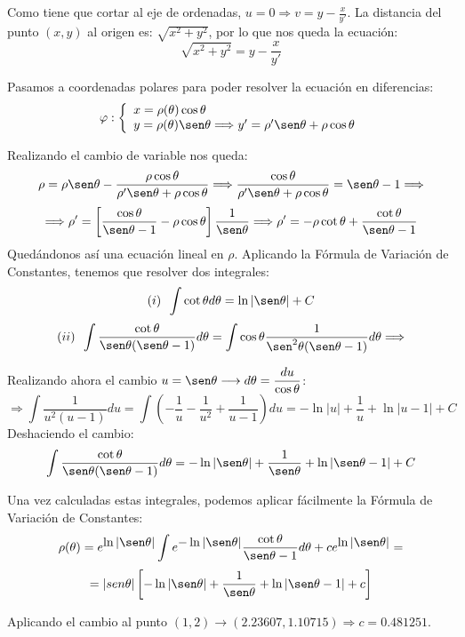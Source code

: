 \documentclass[12pt]{article}
\begin{document}
\begin{enumerate}
Como tiene que cortar al eje de ordenadas, $u=0 \Longrightarrow v = y \displaystyle-\frac{x}{y'}$. La distancia del punto $(x,y)$ al origen es: $\sqrt{x^2+y^2}$, por lo que nos queda la ecuación:
\[
\sqrt{x^2+y^2}=y-\frac{x}{y'}
\]

Pasamos a coordenadas polares para poder resolver la ecuación en diferencias:
\[
\varphi : \left \{ \begin{array}{l}
x=\rho(\theta)\cos\theta \\
y=\rho(\theta)\sen\theta \Longrightarrow y'=\rho'\sen\theta+\rho\cos\theta
\end{array}
\right.
\]

Realizando el cambio de variable nos queda:
\[
\rho=\rho\sen\theta-\frac{\rho\cos\theta}{\rho'\sen\theta+\rho\cos\theta} \Longrightarrow \frac{\cos\theta}{\rho'\sen\theta+\rho\cos\theta}=\sen\theta-1\Longrightarrow
\]
\[
\Longrightarrow\rho'=\left[\frac{\cos\theta}{\sen\theta-1}-\rho\cos\theta\right]\frac{1}{\sen\theta}\Longrightarrow\rho'=-\rho\cot\theta+\frac{\cot\theta}{\sen\theta-1}
\]
Quedándonos así una ecuación lineal en $\rho$. Aplicando la Fórmula de Variación de Constantes, tenemos que resolver dos integrales:
\[
(i)\enskip\int \cot\theta d\theta=\ln|\sen\theta|+C
\]
\[
(ii) \enskip\int \frac{\cot\theta}{\sen\theta(\sen\theta-1)}d\theta=\int \cos\theta\frac{1}{\sen^2\theta(\sen\theta-1)}d\theta \Longrightarrow
\]

Realizando ahora el cambio $u=\sen\theta\longrightarrow d\theta=\displaystyle\frac{du}{\cos\theta}$:
\[
\Longrightarrow \int \frac{1}{u^2(u-1)}du=\int\left(-\frac{1}{u}-\frac{1}{u^2}+\frac{1}{u-1}\right)du=-\ln|u|+\frac{1}{u}+\ln|u-1|+C
\]
Deshaciendo el cambio:
\[
\int\frac{\cot\theta}{\sen\theta(\sen\theta-1)}d\theta=-\ln|\sen\theta|+\frac{1}{\sen\theta}+\ln|\sen\theta-1|+C
\]

Una vez calculadas estas integrales, podemos aplicar fácilmente la Fórmula de Variación de Constantes:
\[
\rho(\theta)=e^{\displaystyle\ln|\sen\theta|}\int e^{\displaystyle-\ln|\sen\theta|}\frac{\cot\theta}{\sen\theta-1}d\theta+ce^{\displaystyle\ln|\sen\theta|}=
\]
\[
=|sen\theta|\left[-\ln|\sen\theta|+\frac{1}{\sen\theta}+\ln|\sen\theta-1|+c\right]
\]

Aplicando el cambio al punto $(1,2) \longrightarrow (2.23607,1.10715) \Longrightarrow c=0.481251$.
\end{enumerate}
\end{document}
